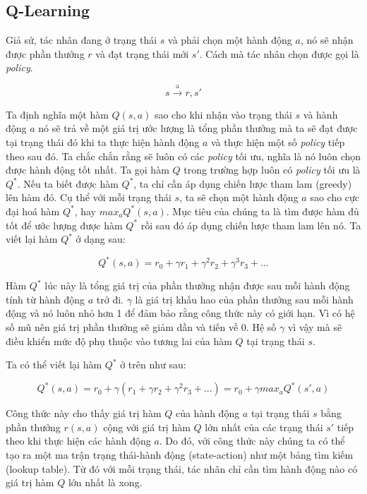 \subsection{Q-Learning}
Giả sử, tác nhân đang ở trạng thái $s$ và phải chọn một hành động
$a$, nó sẽ nhận được phần thưởng $r$ và đạt trạng thái mới $s'$.
Cách mà tác nhân chọn được gọi là \textit{policy}.

\begin{equation*}
    s \xrightarrow{\text{a}} r,s'
\end{equation*}

Ta định nghĩa một hàm $Q(s,a)$ sao cho khi nhận vào trạng thái $s$
và hành động $a$ nó sẽ trả về một giá trị ước lượng là tổng
phần thưởng mà ta sẽ đạt được tại trạng thái đó khi ta thực hiện
hành động $a$ và thực hiện một số \textit{policy} tiếp theo sau đó.
Ta chắc chắn rằng sẽ luôn có các \textit{policy} tối ưu, nghĩa là nó
luôn chọn được hành động tốt nhất. Ta gọi hàm $Q$ trong trường hợp
luôn có \textit{policy} tối ưu là $Q^*$. Nếu ta biết được hàm $Q^*$,
ta chỉ cần áp dụng chiến lược tham lam (greedy) lên hàm đó. Cụ thể
với mỗi trạng thái $s$, ta sẽ chọn một hành động $a$ sao cho
cực đại hoá hàm $Q^*$, hay ${max_a}{Q^*}(s,a)$. Mục tiêu của chúng ta
là tìm được hàm đủ tốt để ước lượng được hàm $Q^*$ rồi sau đó áp dụng
chiến lược tham lam lên nó. Ta viết lại hàm $Q^*$ ở dạng sau:

\begin{equation*}
    Q^*(s,a) = r_0 + {\gamma}r_1 + {\gamma}^{2}r_2 + {\gamma}^{3}r_3 + ...
\end{equation*}

Hàm $Q^*$ lúc này là tổng giá trị của phần thưởng nhận được sau mỗi
hành động tính từ hành động $a$ trở đi. $\gamma$ là giá trị khấu hao
của phần thưởng sau mỗi hành động và nó luôn nhỏ hơn 1 để
đảm bảo rằng công thức này có giới hạn. Vì có hệ số mũ nên giá trị
phần thưởng sẽ giảm dần và tiến về 0. Hệ số $\gamma$ vì vậy mà sẽ
điều khiển mức độ phụ thuộc vào tương lai của hàm $Q$ tại
trạng thái $s$.

Ta có thể viết lại hàm $Q^*$ ở trên như sau:

\begin{equation*}
    Q^*(s,a) = r_0 + {\gamma}(r_1 + {\gamma}r_2 + {\gamma}^{2}r_3 + ...) = r_0 + {\gamma}max_{a}Q^{*}(s',a)
\end{equation*}

Công thức này cho thấy giá trị hàm $Q$ của hành động $a$ tại
trạng thái $s$ bằng phần thưởng $r(s,a)$ cộng với giá trị hàm $Q$
lớn nhất của các trạng thái $s'$ tiếp theo khi thực hiện các
hành động $a$. Do đó, với công thức này chúng ta có thể tạo ra một
ma trận trạng thái-hành động (state-action) như một bảng tìm kiếm
(lookup table). Từ đó với mỗi trạng thái, tác nhân chỉ cần tìm
hành động nào có giá trị hàm $Q$ lớn nhất là xong.

